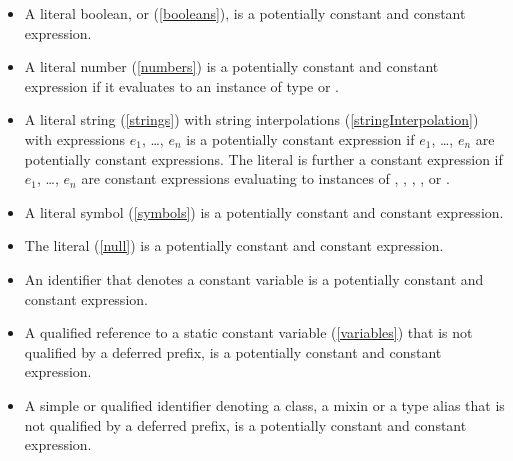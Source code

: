 \documentclass[makeidx]{article}
\begin{document}
{\begin{itemize}
\item
  A literal boolean, \TRUE{} or \FALSE{} (\ref{booleans}),
  is a potentially constant and constant expression.
\item
  A literal number (\ref{numbers}) is
  a potentially constant and constant expression
  if it evaluates to an instance of type  or .
\item
  A literal string (\ref{strings}) with string interpolations
  (\ref{stringInterpolation})
  with expressions $e_1$, \ldots, $e_n$ is a potentially constant expression
  if $e_1$, \ldots, $e_n$ are potentially constant expressions.
  The literal is further a constant expression
  if $e_1$, \ldots, $e_n$ are constant expressions
  evaluating to instances of , ,
  , , or .
\item
  A literal symbol (\ref{symbols}) is
  a potentially constant and constant expression.
\item
  The literal \NULL{} (\ref{null}) is
  a potentially constant and constant expression.
\item
  An identifier that denotes a constant variable is
  a potentially constant and constant expression.
\item
  A qualified reference to a static constant variable
  (\ref{variables})
  that is not qualified by a deferred prefix,
  is a potentially constant and constant expression.
\item
  A simple or qualified identifier denoting a class,
  a mixin or a type alias that is not qualified by a deferred prefix,
  is a potentially constant and constant expression.
\end{itemize}}
\end{document}
